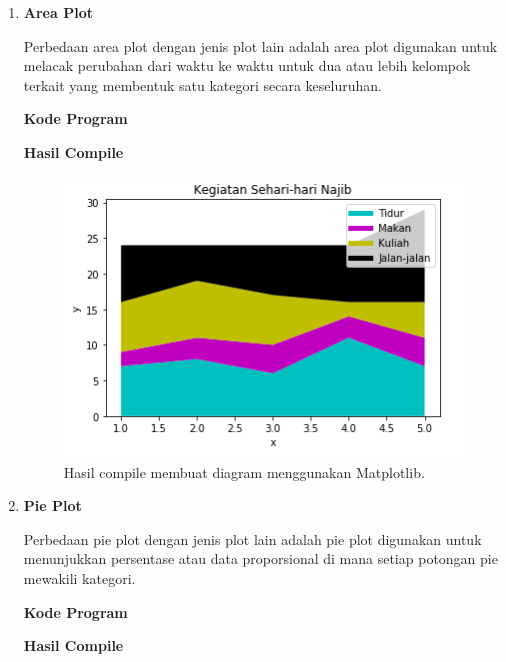 \begin{enumerate}
	\item \textbf{Area Plot}
	
	Perbedaan area plot dengan jenis plot lain adalah area plot digunakan untuk melacak perubahan dari waktu ke waktu untuk dua atau lebih kelompok terkait yang membentuk satu kategori secara keseluruhan.
	
	\textbf{Kode Program}
	
	
	
	\textbf{Hasil Compile}
	
	\begin{figure}[H]
		\includegraphics[width=12cm]{figures/6/1174042/5.png}
		\centering
		\caption{Hasil compile membuat diagram menggunakan Matplotlib.}
	\end{figure}
	
	\item \textbf{Pie Plot}
	
	Perbedaan pie plot dengan jenis plot lain adalah pie plot digunakan untuk menunjukkan persentase atau data proporsional di mana setiap potongan pie mewakili kategori.
	
	\textbf{Kode Program}
	
	
	
	\textbf{Hasil Compile}
	

\end{enumerate}
